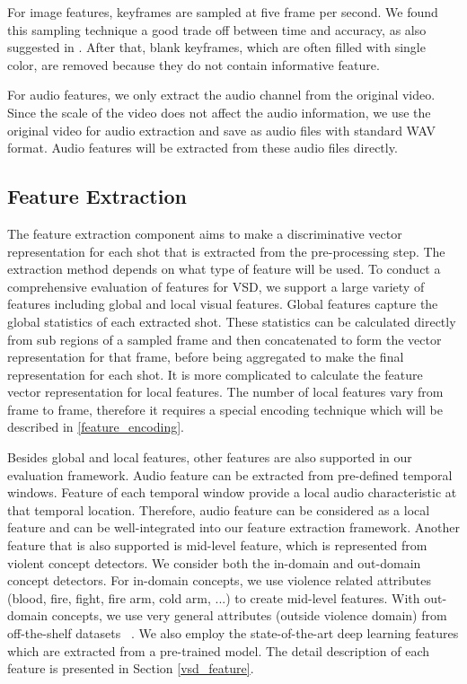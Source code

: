 \documentclass[twocolumn]{bmcart}%
\begin{document}
For image features, keyframes are sampled at five frame per second. We found this sampling technique a good trade off between time and accuracy, as also suggested in \cite{merler2012semantic}. After that, blank keyframes, which are often filled with single color, are removed because they do not contain informative feature.

For audio features, we only extract the audio channel from the original video. Since the scale of the video does not affect the audio information, we use the original video for audio extraction and save as audio files with standard WAV format. Audio features will be extracted from these audio files directly.

\subsection{Feature Extraction}
The feature extraction component aims to make a discriminative vector representation for each shot that is extracted from the pre-processing step. The extraction method depends on what type of feature will be used. To conduct a comprehensive evaluation of features for VSD, we support a large variety of features including global and local visual features. Global features capture the global statistics of each extracted shot. These statistics can be calculated directly from sub regions of a sampled frame and then concatenated to form the vector representation for that frame, before being aggregated to make the final representation for each shot. It is more complicated to calculate the feature vector representation for local features. The number of local features vary from frame to frame, therefore it requires a special encoding technique which will be described in \ref{feature_encoding}.

Besides global and local features, other features are also supported in our evaluation framework. Audio feature can be extracted from pre-defined temporal windows. Feature of each temporal window provide a local audio characteristic at that temporal location. Therefore, audio feature can be considered as a local feature and can be well-integrated into our feature extraction framework. Another feature that is also supported is mid-level feature, which is represented from violent concept detectors. We consider both the in-domain and out-domain concept detectors. For in-domain concepts, we use violence related attributes (blood, fire, fight, fire arm, cold arm, ...) to create mid-level features. With out-domain concepts, we use very general attributes (outside violence domain) from off-the-shelf datasets ~\cite{deng2009imagenet}. We also employ the state-of-the-art deep learning features which are extracted from a pre-trained model. The detail description of each feature is presented in Section \ref{vsd_feature}.
\end{document}
